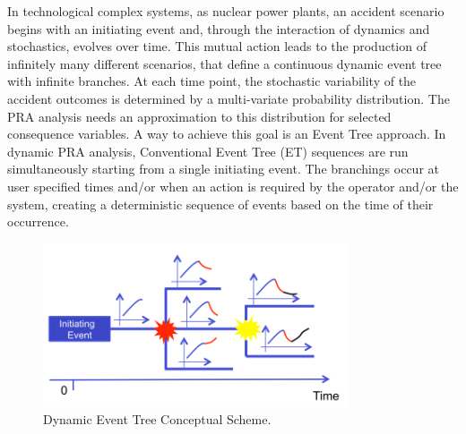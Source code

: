 \documentclass{mc2013}
\begin{document}
\vspace{-5mm}
\label{sec:DET_methodology}
In technological complex systems, as nuclear power  plants, an accident scenario begins with an initiating event and, through the interaction of dynamics and stochastics, evolves over time. This mutual action leads to the production of infinitely many different scenarios, that define a continuous dynamic event tree with infinite branches. At each time point, the stochastic variability of the accident outcomes is determined by a multi-variate probability distribution.
The PRA analysis needs an approximation to this distribution for selected consequence variables. 
A way to achieve this goal is an Event Tree approach. In dynamic PRA analysis, Conventional Event Tree (ET) sequences are run simultaneously starting from a single initiating event. The branchings occur at user specified times and/or when an action is required by the operator and/or the system, creating a deterministic sequence of events based on the time of their occurrence. 
\begin{figure}[h] 
  \centering
     \includegraphics[width=0.8\textwidth]{figures/DET_schemeFlow.png}
  \caption{Dynamic Event Tree Conceptual Scheme.}
   \label{fig:DET_schemeFlow}
\end{figure}
\end{document}
